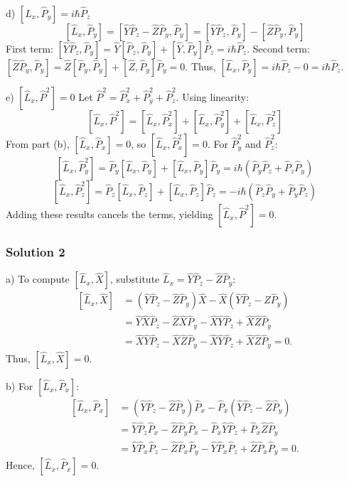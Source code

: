 \documentclass{article}
\begin{document}
d) $[\hat{L}_x, \hat{P}_y] = i\hbar \hat{P}_z$
\[
[\hat{L}_x, \hat{P}_y] = [\hat{Y}\hat{P}_z - \hat{Z}\hat{P}_y, \hat{P}_y] = [\hat{Y}\hat{P}_z, \hat{P}_y] - [\hat{Z}\hat{P}_y, \hat{P}_y]
\]
First term: $[\hat{Y}\hat{P}_z, \hat{P}_y] = \hat{Y}[\hat{P}_z, \hat{P}_y] + [\hat{Y}, \hat{P}_y]\hat{P}_z = i\hbar \hat{P}_z$.  
Second term: $[\hat{Z}\hat{P}_y, \hat{P}_y] = \hat{Z}[\hat{P}_y, \hat{P}_y] + [\hat{Z}, \hat{P}_y]\hat{P}_y = 0$.  
Thus, $[\hat{L}_x, \hat{P}_y] = i\hbar \hat{P}_z - 0 = i\hbar \hat{P}_z$.

e) $[\hat{L}_x, \hat{P}^2] = 0$
Let $\hat{P}^2 = \hat{P}_x^2 + \hat{P}_y^2 + \hat{P}_z^2$. Using linearity:
\[
[\hat{L}_x, \hat{P}^2] = [\hat{L}_x, \hat{P}_x^2] + [\hat{L}_x, \hat{P}_y^2] + [\hat{L}_x, \hat{P}_z^2]
\]
From part (b), $[\hat{L}_x, \hat{P}_x] = 0$, so $[\hat{L}_x, \hat{P}_x^2] = 0$. For $\hat{P}_y^2$ and $\hat{P}_z^2$:
\[
[\hat{L}_x, \hat{P}_y^2] = \hat{P}_y [\hat{L}_x, \hat{P}_y] + [\hat{L}_x, \hat{P}_y] \hat{P}_y = i\hbar (\hat{P}_y \hat{P}_z + \hat{P}_z \hat{P}_y)
\]
\[
[\hat{L}_x, \hat{P}_z^2] = \hat{P}_z [\hat{L}_x, \hat{P}_z] + [\hat{L}_x, \hat{P}_z] \hat{P}_z = -i\hbar (\hat{P}_z \hat{P}_y + \hat{P}_y \hat{P}_z)
\]
Adding these results cancels the terms, yielding $[\hat{L}_x, \hat{P}^2] = 0$.

\subsubsection{Solution 2}

a) To compute \( \left[\hat{L}_x, \hat{X}\right] \), substitute \( \hat{L}_x = \hat{Y}\hat{P}_z - \hat{Z}\hat{P}_y \):
\[
\begin{aligned}
\left[\hat{L}_x, \hat{X}\right] &= (\hat{Y}\hat{P}_z - \hat{Z}\hat{P}_y)\hat{X} - \hat{X}(\hat{Y}\hat{P}_z - \hat{Z}\hat{P}_y) \\
&= \hat{Y}\hat{X}\hat{P}_z - \hat{Z}\hat{X}\hat{P}_y - \hat{X}\hat{Y}\hat{P}_z + \hat{X}\hat{Z}\hat{P}_y \\
&= \hat{X}\hat{Y}\hat{P}_z - \hat{X}\hat{Z}\hat{P}_y - \hat{X}\hat{Y}\hat{P}_z + \hat{X}\hat{Z}\hat{P}_y = 0.
\end{aligned}
\]
Thus, \( \left[\hat{L}_x, \hat{X}\right] = 0 \).

\medskip

b) For \( \left[\hat{L}_x, \hat{P}_x\right] \):
\[
\begin{aligned}
\left[\hat{L}_x, \hat{P}_x\right] &= (\hat{Y}\hat{P}_z - \hat{Z}\hat{P}_y)\hat{P}_x - \hat{P}_x(\hat{Y}\hat{P}_z - \hat{Z}\hat{P}_y) \\
&= \hat{Y}\hat{P}_z\hat{P}_x - \hat{Z}\hat{P}_y\hat{P}_x - \hat{P}_x\hat{Y}\hat{P}_z + \hat{P}_x\hat{Z}\hat{P}_y \\
&= \hat{Y}\hat{P}_x\hat{P}_z - \hat{Z}\hat{P}_x\hat{P}_y - \hat{Y}\hat{P}_x\hat{P}_z + \hat{Z}\hat{P}_x\hat{P}_y = 0.
\end{aligned}
\]
Hence, \( \left[\hat{L}_x, \hat{P}_x\right] = 0 \).
\end{document}
